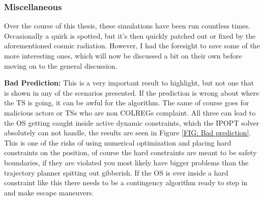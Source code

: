 \subsubsection{Miscellaneous}

Over the course of this thesis, these simulations have been run countless times. Occasionally a quirk is spotted, but it's
then quickly patched out or fixed by the aforementioned cosmic radiation. However, I had the foresight to save some of the more
interesting ones, which will now be discussed a bit on their own before moving on to the general discussion.

\textbf{Bad Prediction:}\newline
This is a very important result to highlight, but not one that is shown in any of the scenarios presented. If the prediction is wrong
about where the TS is going, it can be awful for the algorithm. The same of course goes for malicious actors or TSs who are
non COLREGs complaint. All three can lead to the OS getting caught inside active dynamic constraints, which the IPOPT solver
absolutely can not handle, the results are seen in Figure \ref{FIG: Bad prediction}. This is one of the risks of using
numerical optimization and placing hard constraints on the position, of course the hard constraints are meant to be safety boundaries,
if they are violated you most likely have bigger problems than the trajectory planner spitting out gibberish. If the OS is ever
inside a hard constraint like this there needs to be a contingency algorithm ready to step in and make escape maneuvers.

